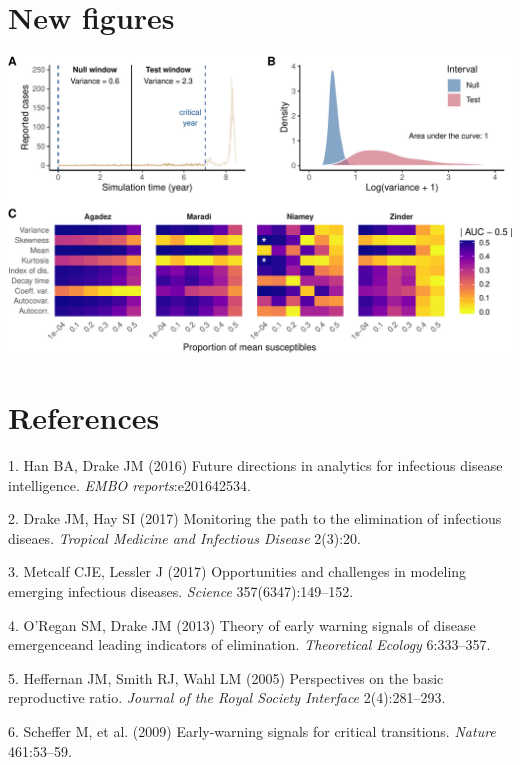 \documentclass[3p]{elsarticle} %
\makeatletter
\def\maxwidth{\ifdim\Gin@nat@width>\linewidth\linewidth
\else\Gin@nat@width\fi}
\let\Oldincludegraphics\includegraphics
\renewcommand{\includegraphics}[1]{\Oldincludegraphics[width=\maxwidth]{#1}}
\makeatother
\begin{document}
\section{New figures}\label{new-figures}

\includegraphics{measles-ews-manuscript_files/figure-latex/emergence-1.pdf}

\section*{References}\label{references}

\hypertarget{refs}{}
\hypertarget{ref-Han2016}{}
1. Han BA, Drake JM (2016) Future directions in analytics for infectious
disease intelligence. \emph{EMBO reports}:e201642534.

\hypertarget{ref-Drake2017}{}
2. Drake JM, Hay SI (2017) Monitoring the path to the elimination of
infectious diseaes. \emph{Tropical Medicine and Infectious Disease}
2(3):20.

\hypertarget{ref-Metcalf2017}{}
3. Metcalf CJE, Lessler J (2017) Opportunities and challenges in
modeling emerging infectious diseases. \emph{Science}
357(6347):149--152.

\hypertarget{ref-ORegan2013}{}
4. O'Regan SM, Drake JM (2013) Theory of early warning signals of
disease emergenceand leading indicators of elimination.
\emph{Theoretical Ecology} 6:333--357.

\hypertarget{ref-Heffernan2005}{}
5. Heffernan JM, Smith RJ, Wahl LM (2005) Perspectives on the basic
reproductive ratio. \emph{Journal of the Royal Society Interface}
2(4):281--293.

\hypertarget{ref-Scheffer2009}{}
6. Scheffer M, et al. (2009) Early-warning signals for critical
transitions. \emph{Nature} 461:53--59.
\end{document}
